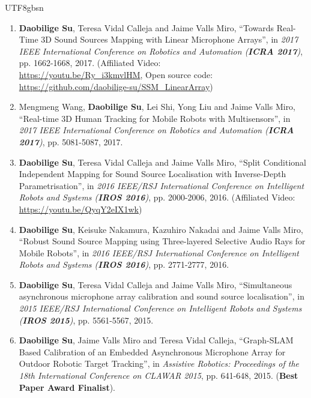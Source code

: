 \documentclass[margin,line]{res}
\begin{document}
\begin{CJK*}{UTF8}{gbsn}
\begin{resume}
\begin{enumerate}
\item {\bf Daobilige Su}, Teresa Vidal Calleja and Jaime Valls Miro, ``Towards Real-Time 3D Sound Sources Mapping with Linear Microphone Arrays'', in {\it 2017 IEEE International Conference on Robotics and Automation (\textbf{ICRA 2017})}, pp. 1662-1668, 2017.
(Affiliated Video: \\ \href{https://youtu.be/Ry_i3kmvlHM}{{https://youtu.be/Ry\_i3kmvlHM}}, Open source code: \\ \href{https://github.com/daobilige-su/SSM_LinearArray}{{https://github.com/daobilige-su/SSM\_LinearArray}})

\item Mengmeng Wang, {\bf Daobilige Su}, Lei Shi, Yong Liu and Jaime Valls Miro, ``Real-time 3D Human Tracking for Mobile Robots with Multisensors'', in {\it 2017 IEEE International Conference on Robotics and Automation (\textbf{ICRA 2017})}, pp. 5081-5087, 2017.

\item {\bf Daobilige Su}, Teresa Vidal Calleja and Jaime Valls Miro, ``Split Conditional Independent Mapping for Sound Source Localisation with Inverse-Depth Parametrisation'', in {\it 2016 IEEE/RSJ International Conference on Intelligent Robots and Systems (\textbf{IROS 2016})}, pp. 2000-2006, 2016. (Affiliated Video: \href{https://youtu.be/QyqY2eIX1wk}{{https://youtu.be/QyqY2eIX1wk}})

\item {\bf Daobilige Su}, Keisuke Nakamura, Kazuhiro Nakadai and Jaime Valls Miro, ``Robust Sound Source Mapping using Three-layered Selective Audio Rays for Mobile Robots'', in {\it 2016 IEEE/RSJ International Conference on Intelligent Robots and Systems (\textbf{IROS 2016})}, pp. 2771-2777, 2016.

\item {\bf Daobilige Su}, Teresa Vidal Calleja and Jaime Valls Miro, ``Simultaneous asynchronous microphone array calibration and sound source localisation'', in {\it 2015 IEEE/RSJ International Conference on Intelligent Robots and Systems (\textbf{IROS 2015})}, pp. 5561-5567, 2015.

\item {\bf Daobilige Su}, Jaime Valls Miro and Teresa Vidal Calleja, ``Graph-SLAM Based Calibration of an Embedded Asynchronous Microphone Array for Outdoor Robotic Target Tracking'', in {\it Assistive Robotics: Proceedings of the 18th International Conference on CLAWAR 2015}, pp. 641-648, 2015. ({\bf Best Paper Award Finalist}).


\end{enumerate}
\end{resume}
\end{CJK*}
\end{document}
